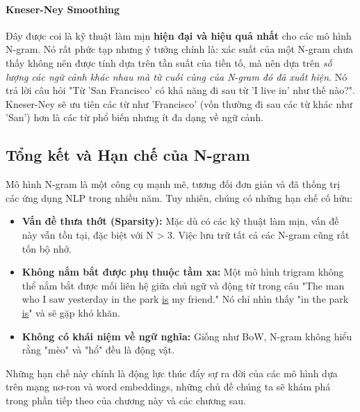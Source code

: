 \paragraph{Kneser-Ney Smoothing}
Đây được coi là kỹ thuật làm mịn \textbf{hiện đại và hiệu quả nhất} cho các mô hình N-gram. Nó rất phức tạp nhưng ý tưởng chính là: xác suất của một N-gram chưa thấy không nên được tính dựa trên tần suất của tiền tố, mà nên dựa trên \textit{số lượng các ngữ cảnh khác nhau mà từ cuối cùng của N-gram đó đã xuất hiện}. Nó trả lời câu hỏi "Từ 'San Francisco' có khả năng đi sau từ 'I live in' như thế nào?". Kneser-Ney sẽ ưu tiên các từ như 'Francisco' (vốn thường đi sau các từ khác như 'San') hơn là các từ phổ biến nhưng ít đa dạng về ngữ cảnh.

\subsection{Tổng kết và Hạn chế của N-gram}
Mô hình N-gram là một công cụ mạnh mẽ, tương đối đơn giản và đã thống trị các ứng dụng NLP trong nhiều năm. Tuy nhiên, chúng có những hạn chế cố hữu:
\begin{itemize}
    \item \textbf{Vấn đề thưa thớt (Sparsity):} Mặc dù có các kỹ thuật làm mịn, vấn đề này vẫn tồn tại, đặc biệt với N > 3. Việc lưu trữ tất cả các N-gram cũng rất tốn bộ nhớ.
    \item \textbf{Không nắm bắt được phụ thuộc tầm xa:} Một mô hình trigram không thể nắm bắt được mối liên hệ giữa chủ ngữ và động từ trong câu "The man who I saw yesterday in the park \underline{is} my friend." Nó chỉ nhìn thấy "in the park \underline{is}" và sẽ gặp khó khăn.
    \item \textbf{Không có khái niệm về ngữ nghĩa:} Giống như BoW, N-gram không hiểu rằng "mèo" và "hổ" đều là động vật.
\end{itemize}

Những hạn chế này chính là động lực thúc đẩy sự ra đời của các mô hình dựa trên mạng nơ-ron và word embeddings, những chủ đề chúng ta sẽ khám phá trong phần tiếp theo của chương này và các chương sau.